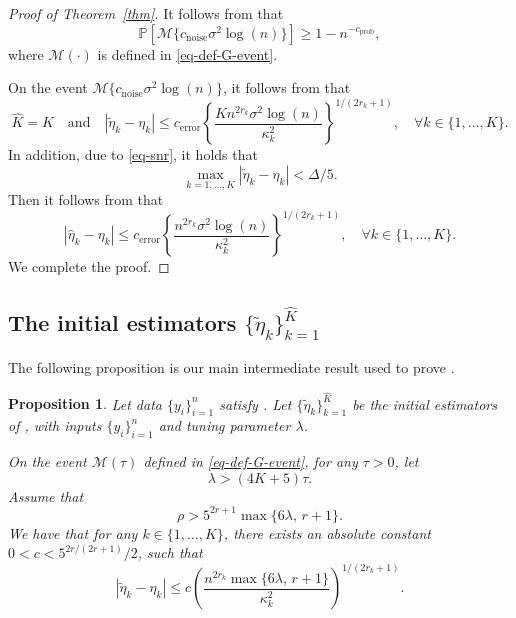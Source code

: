 \documentclass{article}
\newtheorem{proposition}[theorem]{Proposition}
\begin{document}
\begin{proof}[Proof of Theorem~\ref{thm}]
It follows from  that
	\[
		\mathbb{P}\left[\mathcal{M}\{c_{\mathrm{noise}} \sigma^2 \log(n)\}\right] \geq 1 - n^{-c_{\mathrm{prob}}},
	\]
	where $\mathcal{M}(\cdot)$ is defined in \eqref{eq-def-G-event}.  
	
On the event $\mathcal{M}\{c_{\mathrm{noise}} \sigma^2 \log(n)\}$, it follows from  that 
	\[
		\widehat{K} = K \quad \mbox{and} \quad |\widetilde{\eta}_k - \eta_k| \leq c_{\mathrm{error}} \left\{\frac{K n^{2r_k} \sigma^2 \log(n)}{\kappa_k^2}\right\}^{1/(2r_k+1)}, \quad \forall k \in \{1, \ldots, K\}.
	\]
	In addition, due to \eqref{eq-snr}, it holds that 
	\[
		\max_{k = 1, \ldots, K}|\widetilde{\eta}_k - \eta_k| < \Delta/5.
	\]
	Then it follows from  that
	\[
		|\widehat{\eta}_k - \eta_k| \leq c_{\mathrm{error}} \left\{\frac{n^{2r_k} \sigma^2 \log(n)}{\kappa_k^2}\right\}^{1/(2r_k+1)}, \quad \forall k \in \{1, \ldots, K\}.
	\]
	We complete the proof.
\end{proof}



\subsection{The initial estimators $\{\widetilde{\eta}_k\}_{k = 1}^{\widehat{K}}$}

The following proposition is our main intermediate result used to prove .

\begin{proposition}\label{prop:main1}
Let data $\{y_i\}_{i = 1}^n$ satisfy .  Let $\{\widetilde{\eta}_k\}_{k = 1}^{\widehat{K}}$ be the initial estimators of , with inputs $\{y_i\}_{i = 1}^n$ and tuning parameter $\lambda$.  

On the event $\mathcal{M}(\tau)$ defined in \eqref{eq-def-G-event}, for any $\tau > 0$, let
	\begin{equation}\label{eq-lambda-prop-main-1}
		\lambda > (4 K + 5)\tau.
	\end{equation}
	Assume that
	\begin{equation}\label{eq-rho-prop-main-1}
		\rho > 5^{2r + 1} \max\{6 \lambda, \, r + 1\}.
	\end{equation}
	We have that for any $k \in \{1, \ldots, K\}$, there exists an absolute constant $0< c < 5^{2r/(2r+1)}/2$, such that
	\[
		|\widetilde{\eta}_k - \eta_k| \leq c\left(\frac{n^{2r_k}\max\{6 \lambda, \, r + 1\}}{\kappa_k^2}\right)^{1/(2r_k + 1)}.
	\]
\end{proposition}
\end{document}
